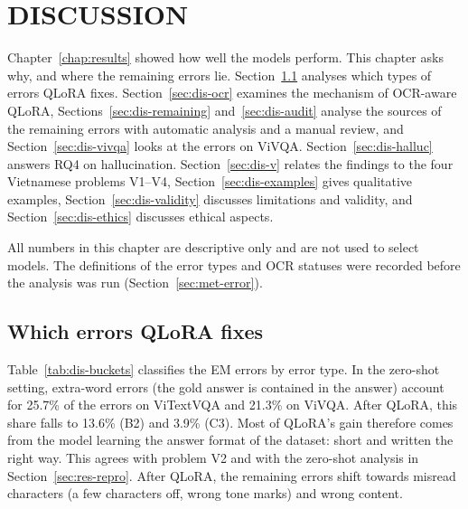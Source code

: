 
\chapter{DISCUSSION}
\label{chap:discussion}

\ifpdf
    \graphicspath{{Chapter7/Figs/Raster/}{Chapter7/Figs/PDF/}{Chapter7/Figs/}}
\else
    \graphicspath{{Chapter7/Figs/Vector/}{Chapter7/Figs/}}
\fi

Chapter~\ref{chap:results} showed how well the models perform. This chapter asks why, and
where the remaining errors lie. Section~\ref{sec:dis-qlora} analyses which types of errors
QLoRA fixes. Section~\ref{sec:dis-ocr} examines the mechanism of OCR-aware QLoRA,
Sections~\ref{sec:dis-remaining} and~\ref{sec:dis-audit} analyse the sources of the
remaining errors with automatic analysis and a manual review, and
Section~\ref{sec:dis-vivqa} looks at the errors on ViVQA. Section~\ref{sec:dis-halluc}
answers RQ4 on hallucination. Section~\ref{sec:dis-v} relates the findings to the four
Vietnamese problems V1--V4, Section~\ref{sec:dis-examples} gives qualitative examples,
Section~\ref{sec:dis-validity} discusses limitations and validity, and
Section~\ref{sec:dis-ethics} discusses ethical aspects.

All numbers in this chapter are descriptive only and are not used to select models. The
definitions of the error types and OCR statuses were recorded before the analysis was run
(Section~\ref{sec:met-error}).

\section{Which errors QLoRA fixes}
\label{sec:dis-qlora}

Table~\ref{tab:dis-buckets} classifies the EM errors by error type. In the zero-shot
setting, extra-word errors (the gold answer is contained in the answer) account for 25.7\%
of the errors on ViTextVQA and 21.3\% on ViVQA. After QLoRA, this share falls to 13.6\%
(B2) and 3.9\% (C3). Most of QLoRA's gain therefore comes from the model learning the
answer format of the dataset: short and written the right way. This agrees with problem
V2 and with the zero-shot analysis in Section~\ref{sec:res-repro}. After QLoRA, the
remaining errors shift towards misread characters (a few characters off, wrong tone marks)
and wrong content.

